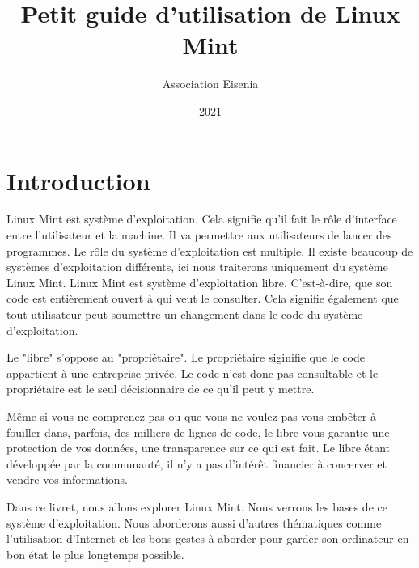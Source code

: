 \documentclass[12pt]{book}
\title{Petit guide d'utilisation de Linux Mint}
\author{Association Eisenia}
\date{2021}
\begin{document}
\maketitle

\newpage
\renewcommand{\contentsname}{Table des matières}
\tableofcontents

\renewcommand{\chaptername}{Chapitre}
\chapter{Introduction}
Linux Mint est système d'exploitation.
Cela signifie qu'il fait le rôle d'interface entre l'utilisateur et la machine.
Il va permettre aux utilisateurs de lancer des programmes.
Le rôle du système d'exploitation est multiple.
Il existe beaucoup de systèmes d'exploitation différents, ici nous traiterons uniquement du système Linux Mint.
Linux Mint est système d'exploitation libre.
C'est-à-dire, que son code est entièrement ouvert à qui veut le consulter.
Cela signifie également que tout utilisateur peut soumettre un changement dans le code du système d'exploitation.\par
Le "libre" s'oppose au "propriétaire".
Le propriétaire siginifie que le code appartient à une entreprise privée.
Le code n'est donc pas consultable et le propriétaire est le seul décisionnaire de ce qu'il peut y mettre.\par
Même si vous ne comprenez pas ou que vous ne voulez pas vous embêter à fouiller dans, parfois, des milliers de lignes de code, le libre vous garantie une protection de vos données, une transparence sur ce qui est fait.
Le libre étant développée par la communauté, il n'y a pas d'intérêt financier à concerver et vendre vos informations.\par
Dans ce livret, nous allons explorer Linux Mint.
Nous verrons les bases de ce système d'exploitation.
Nous aborderons aussi d'autres thématiques comme l'utilisation d'Internet et les bons gestes à aborder pour garder son ordinateur en bon état le plus longtemps possible.
\end{document}
